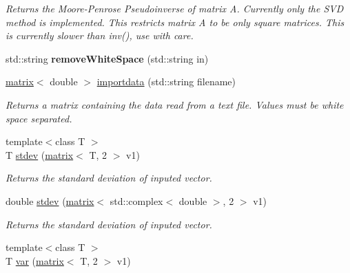 \begin{DoxyCompactItemize}
\begin{DoxyCompactList}\small\item\em Returns the Moore-\/\-Penrose Pseudoinverse of matrix A. Currently only the S\-V\-D method is implemented. This restricts matrix A to be only square matrices. This is currently slower than inv(), use with care. \end{DoxyCompactList}\item 
\hypertarget{namespacekeycpp_ad70d9156c4b6a75e5b7a4c799f900162}{std\-::string {\bfseries remove\-White\-Space} (std\-::string in)}\label{namespacekeycpp_ad70d9156c4b6a75e5b7a4c799f900162}

\item 
\hypertarget{namespacekeycpp_ac5c0a8bc58229a412ec2068979b6b84e}{\hyperlink{classkeycpp_1_1matrix}{matrix}$<$ double $>$ \hyperlink{namespacekeycpp_ac5c0a8bc58229a412ec2068979b6b84e}{importdata} (std\-::string filename)}\label{namespacekeycpp_ac5c0a8bc58229a412ec2068979b6b84e}

\begin{DoxyCompactList}\small\item\em Returns a matrix containing the data read from a text file. Values must be white space separated. \end{DoxyCompactList}\item 
\hypertarget{namespacekeycpp_ada4b54cb009afd7217ea23f1778021c1}{{\footnotesize template$<$class T $>$ }\\T \hyperlink{namespacekeycpp_ada4b54cb009afd7217ea23f1778021c1}{stdev} (\hyperlink{classkeycpp_1_1matrix}{matrix}$<$ T, 2 $>$ v1)}\label{namespacekeycpp_ada4b54cb009afd7217ea23f1778021c1}

\begin{DoxyCompactList}\small\item\em Returns the standard deviation of inputed vector. \end{DoxyCompactList}\item 
\hypertarget{namespacekeycpp_a3742d74c104a006f442440544dbc22e8}{double \hyperlink{namespacekeycpp_a3742d74c104a006f442440544dbc22e8}{stdev} (\hyperlink{classkeycpp_1_1matrix}{matrix}$<$ std\-::complex$<$ double $>$, 2 $>$ v1)}\label{namespacekeycpp_a3742d74c104a006f442440544dbc22e8}

\begin{DoxyCompactList}\small\item\em Returns the standard deviation of inputed vector. \end{DoxyCompactList}\item 
\hypertarget{namespacekeycpp_a8ce2d2a4c296ae28d1081f4345c3a947}{{\footnotesize template$<$class T $>$ }\\T \hyperlink{namespacekeycpp_a8ce2d2a4c296ae28d1081f4345c3a947}{var} (\hyperlink{classkeycpp_1_1matrix}{matrix}$<$ T, 2 $>$ v1)}\label{namespacekeycpp_a8ce2d2a4c296ae28d1081f4345c3a947}


\end{DoxyCompactItemize}
